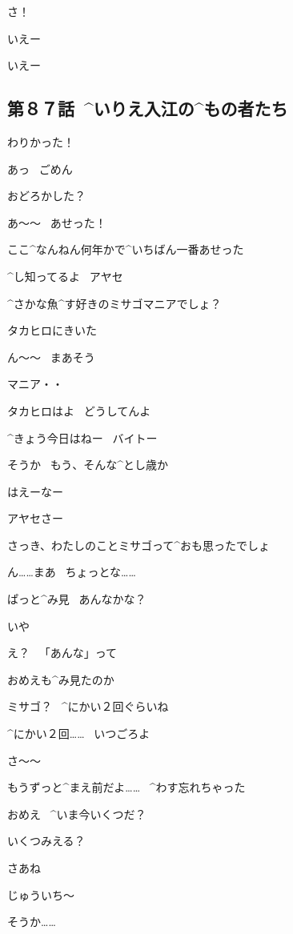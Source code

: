 \Alpha さ！

\page
\Alpha いえー

\Ojisan いえー


\subsection{第８７話\ ^{いりえ}{入江}の^{もの}{者}たち}

\page[141]
\Ayase わりかった！

\page[144]
\Makki あっ
\ ごめん

\Makki おどろかした？

\page
\Ayase あ〜〜
\ あせった！

\Ayase ここ^{なんねん}{何年}かで^{いちばん}{一番}あせった

\Makki ^{し}{知}ってるよ
\ アヤセ

\Makki ^{さかな}{魚}^{す}{好}きのミサゴマニアでしょ？

\Makki タカヒロにきいた

\Ayase ん〜〜
\ まあそう

\Ayase マニア・・

\page
\Ayase タカヒロはよ
\ どうしてんよ

\Makki ^{きょう}{今日}はねー
\ バイトー

\Ayase そうか
\ もう、そんな^{とし}{歳}か

\Ayase はえーなー

\Makki アヤセさー

\Makki さっき、わたしのことミサゴって^{おも}{思}ったでしょ

\Ayase ん……まあ
\ ちょっとな……

\page
\Makki ぱっと^{み}{見}
\ あんなかな？

\Ayase いや

\Ayase え？
\ 「あんな」って

\Ayase おめえも^{み}{見}たのか

\Makki ミサゴ？
\ ^{にかい}{２回}ぐらいね

\Ayase ^{にかい}{２回}……
\ いつごろよ

\Makki さ〜〜

\Makki もうずっと^{まえ}{前}だよ……
\ ^{わす}{忘}れちゃった

\page
\Ayase おめえ
\ ^{いま}{今}いくつだ？

\Makki いくつみえる？

\Ayase さあね

\Makki じゅういち〜

\Ayase そうか……


